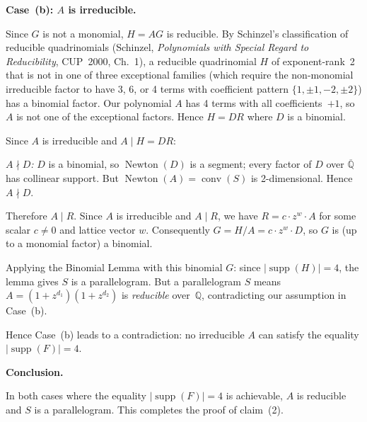 \medskip
\textbf{Case~(b): \(A\) is irreducible.}

Since \(G\) is not a monomial, \(H=AG\) is reducible.  By Schinzel's classification of
reducible quadrinomials (Schinzel, \emph{Polynomials with Special Regard to Reducibility},
CUP~2000, Ch.~1), a reducible quadrinomial \(H\) of exponent-rank~2 that is not in one
of three exceptional families (which require the non-monomial irreducible factor to have
3, 6, or 4 terms with coefficient pattern \(\{1,\pm1,-2,\pm2\}\)) has a binomial factor.
Our polynomial \(A\) has 4 terms with all coefficients~\(+1\), so \(A\) is not one of the
exceptional factors.  Hence \(H=DR\) where \(D\) is a binomial.

Since \(A\) is irreducible and \(A\mid H=DR\):

\emph{\(A\nmid D\):}  \(D\) is a binomial, so \(\operatorname{Newton}(D)\) is a segment; every
factor of \(D\) over \(\overline{\mathbb{Q}}\) has collinear support.  But
\(\operatorname{Newton}(A)=\operatorname{conv}(S)\) is 2-dimensional.  Hence \(A\nmid D\).

Therefore \(A\mid R\).  Since \(A\) is irreducible and \(A\mid R\), we have
\(R=c\cdot z^w\cdot A\) for some scalar \(c\neq0\) and lattice vector \(w\).
Consequently \(G=H/A=c\cdot z^w\cdot D\), so \(G\) is (up to a monomial factor) a
binomial.

Applying the Binomial Lemma with this binomial \(G\): since \(|\operatorname{supp}(H)|=4\),
the lemma gives \(S\) is a parallelogram.  But a parallelogram \(S\) means
\(A=(1+z^{d_1})(1+z^{d_2})\) is \emph{reducible} over~\(\mathbb{Q}\), contradicting our
assumption in Case~(b).

Hence Case~(b) leads to a contradiction: no irreducible \(A\) can satisfy the equality
\(|\operatorname{supp}(F)|=4\).

\medskip
\textbf{Conclusion.}

In both cases where the equality \(|\operatorname{supp}(F)|=4\) is achievable, \(A\) is
reducible and \(S\) is a parallelogram.  This completes the proof of claim~(2).
